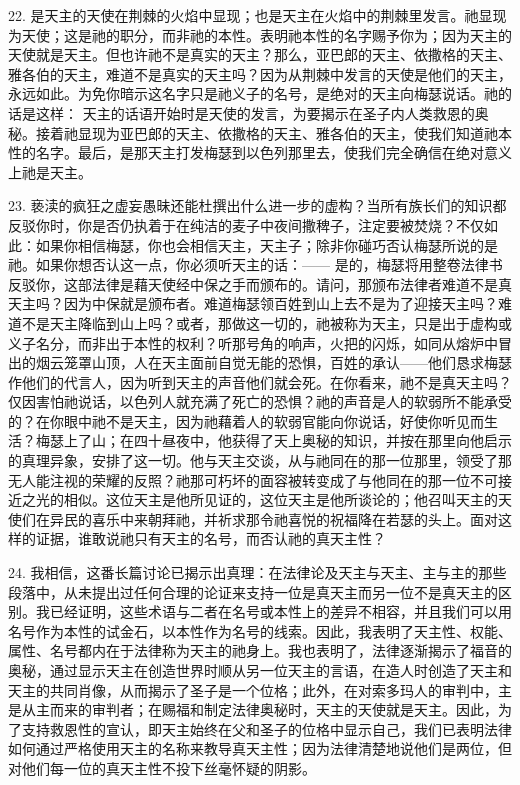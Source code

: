 22. 是天主的天使在荆棘的火焰中显现；也是天主在火焰中的荆棘里发言。祂显现为天使；这是祂的职分，而非祂的本性。表明祂本性的名字赐予你为；因为天主的天使就是天主。但也许祂不是真实的天主？那么，亚巴郎的天主、依撒格的天主、雅各伯的天主，难道不是真实的天主吗？因为从荆棘中发言的天使是他们的天主，永远如此。为免你暗示这名字只是祂义子的名号，是绝对的天主向梅瑟说话。祂的话是这样： 天主的话语开始时是天使的发言，为要揭示在圣子内人类救恩的奥秘。接着祂显现为亚巴郎的天主、依撒格的天主、雅各伯的天主，使我们知道祂本性的名字。最后，是那天主打发梅瑟到以色列那里去，使我们完全确信在绝对意义上祂是天主。\par

23. 亵渎的疯狂之虚妄愚昧还能杜撰出什么进一步的虚构？当所有族长们的知识都反驳你时，你是否仍执着于在纯洁的麦子中夜间撒稗子，注定要被焚烧？不仅如此：如果你相信梅瑟，你也会相信天主，天主子；除非你碰巧否认梅瑟所说的是祂。如果你想否认这一点，你必须听天主的话：—— 是的，梅瑟将用整卷法律书反驳你，这部法律是藉天使经中保之手而颁布的。请问，那颁布法律者难道不是真天主吗？因为中保就是颁布者。难道梅瑟领百姓到山上去不是为了迎接天主吗？难道不是天主降临到山上吗？或者，那做这一切的，祂被称为天主，只是出于虚构或义子名分，而非出于本性的权利？听那号角的响声，火把的闪烁，如同从熔炉中冒出的烟云笼罩山顶，人在天主面前自觉无能的恐惧，百姓的承认——他们恳求梅瑟作他们的代言人，因为听到天主的声音他们就会死。在你看来，祂不是真天主吗？仅因害怕祂说话，以色列人就充满了死亡的恐惧？祂的声音是人的软弱所不能承受的？在你眼中祂不是天主，因为祂藉着人的软弱官能向你说话，好使你听见而生活？梅瑟上了山；在四十昼夜中，他获得了天上奥秘的知识，并按在那里向他启示的真理异象，安排了这一切。他与天主交谈，从与祂同在的那一位那里，领受了那无人能注视的荣耀的反照？祂那可朽坏的面容被转变成了与他同在的那一位不可接近之光的相似。这位天主是他所见证的，这位天主是他所谈论的；他召叫天主的天使们在异民的喜乐中来朝拜祂，并祈求那令祂喜悦的祝福降在若瑟的头上。面对这样的证据，谁敢说祂只有天主的名号，而否认祂的真天主性？\par

24. 我相信，这番长篇讨论已揭示出真理：在法律论及天主与天主、主与主的那些段落中，从未提出过任何合理的论证来支持一位是真天主而另一位不是真天主的区别。我已经证明，这些术语与二者在名号或本性上的差异不相容，并且我们可以用名号作为本性的试金石，以本性作为名号的线索。因此，我表明了天主性、权能、属性、名号都内在于法律称为天主的祂身上。我也表明了，法律逐渐揭示了福音的奥秘，通过显示天主在创造世界时顺从另一位天主的言语，在造人时创造了天主和天主的共同肖像，从而揭示了圣子是一个位格；此外，在对索多玛人的审判中，主是从主而来的审判者；在赐福和制定法律奥秘时，天主的天使就是天主。因此，为了支持救恩性的宣认，即天主始终在父和圣子的位格中显示自己，我们已表明法律如何通过严格使用天主的名称来教导真天主性；因为法律清楚地说他们是两位，但对他们每一位的真天主性不投下丝毫怀疑的阴影。\par

